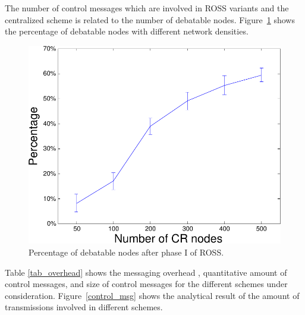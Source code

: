 \documentclass[times]{ettauth}
\theoremstyle{mytheoremstyle}
\theoremstyle{mytheoremstyle}
\theoremstyle{mytheoremstyle}
\begin{document}
The number of control messages which are involved in ROSS variants and the centralized scheme is related to the number of debatable nodes.
Figure~\ref{percentage_overlapping_node} shows the percentage of debatable nodes with different network densities.
\begin{figure}[ht!]
  \centering
  \includegraphics[width=0.6\linewidth]{percentage_overlapping_node.pdf}
  \caption{Percentage of debatable nodes after phase I of ROSS.}
  \label{percentage_overlapping_node}
\end{figure}
%
%
%
%
Table \ref{tab_overhead} shows the messaging overhead , quantitative amount of control messages, and size of control messages for the different schemes under consideration.
Figure~\ref{control_msg} shows the analytical result of the amount of transmissions involved in different schemes.
\end{document}
